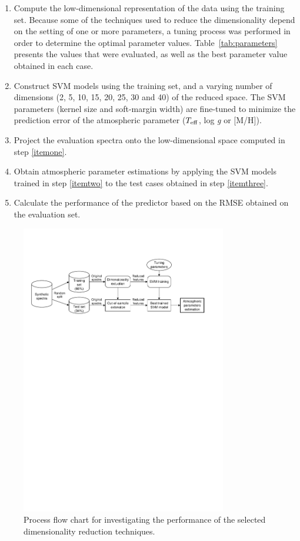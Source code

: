\documentclass[a4paper,fleqn,usenatbib]{mnras}
\begin{document}
{{{\begin{enumerate}
\item \label{itemone} Compute the low-dimensional representation of
  the data using the training set. Because some of the techniques used
  to reduce the dimensionality depend on the setting of one or more
  parameters, a tuning process was performed in order to determine the
  optimal parameter values. Table~\ref{tab:parameters} presents the
  values that were evaluated, as well as the best parameter value
  obtained in each case.
\item \label{itemtwo} Construct SVM models using the training set, and a varying
  number of dimensions (2, 5, 10, 15, 20, 25, 30 and 40) of the
  reduced space. The SVM parameters (kernel size and soft-margin
  width) are fine-tuned to minimize the prediction error of the
  atmospheric parameter ($T_{\rm eff}$, log \textit{g} or [M/H]).
\item \label{itemthree} Project the evaluation spectra onto the
  low-dimensional space computed in step \ref{itemone}.
\item Obtain atmospheric parameter estimations by applying the SVM
  models trained in step \ref{itemtwo} to the test cases obtained in
  step \ref{itemthree}.
\item Calculate the performance of the predictor based on the RMSE
  obtained on the evaluation set.
\end{enumerate}

\begin{figure}
\centering\includegraphics[width=0.8\textwidth]{flowchart.pdf}
\caption{Process flow chart for investigating the performance of the 
selected dimensionality reduction techniques.}
\label{fig:flowchart}
\end{figure}

}}}
\end{document}
